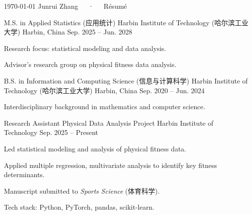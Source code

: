 \documentclass[11pt, a4paper]{awesome-cv}
\begin{document}
\makecvheader[C]

\makecvfooter
  {\today}
  {Junrui Zhang~~~·~~~Résumé}
  {\thepage}



\begin{cventries}

  \cventry
    {M.S. in Applied Statistics (应用统计)} %
    {Harbin Institute of Technology (哈尔滨工业大学)} %
    {Harbin, China} %
    {Sep. 2025 -- Jun. 2028} %
    {
      \begin{cvitems} %
        \item {Research focus: statistical modeling and data analysis.}
        \item {Advisor's research group on physical fitness data analysis.}
      \end{cvitems}
    }

  \cventry
    {B.S. in Information and Computing Science (信息与计算科学)} %
    {Harbin Institute of Technology (哈尔滨工业大学)} %
    {Harbin, China} %
    {Sep. 2020 -- Jun. 2024} %
    {
      \begin{cvitems}
        \item {Interdisciplinary background in mathematics and computer science.}
      \end{cvitems}
    }

\end{cventries}


\begin{cventries}

  \cventry
    {Research Assistant} %
    {Physical Data Analysis Project} %
    {Harbin Institute of Technology} %
    {Sep. 2025 -- Present} %
    {
      \begin{cvitems}
        \item {Led statistical modeling and analysis of physical fitness data.}
        \item {Applied multiple regression, multivariate analysis to identify key fitness determinants.}
        \item {Manuscript submitted to \textit{Sports Science} (体育科学).}
        \item {Tech stack: Python, PyTorch, pandas, scikit-learn.}
      \end{cvitems}
    }

\end{cventries}
\end{document}
